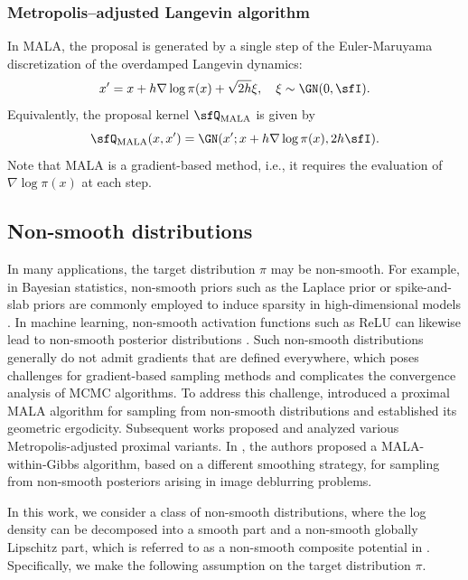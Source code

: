 \documentclass[11pt]{article}
\begin{document}
\subsubsection{Metropolis--adjusted Langevin algorithm}
\label{sec:MALA}
%
In MALA, the proposal is generated by a single step of the Euler-Maruyama discretization of the overdamped Langevin dynamics:
\begin{equation}
    x' = x + h \nabla \log \pi(x) + \sqrt{2h} \xi, \quad \xi \sim \GN(0,\sfI).
\end{equation}
Equivalently, the proposal kernel $\sfQ_{\rm MALA}$ is given by
\begin{equation}
\label{eqn:Q_MALA}
    \sfQ_{\rm MALA}(x,x') = \GN(x'; x + h \nabla \log \pi(x), 2h \sfI).
\end{equation}
%
Note that MALA is a gradient-based method, i.e., it requires the evaluation of $\nabla \log \pi(x)$ at each step.




\subsection{Non-smooth distributions}
\label{sec:NonSmthDist}

In many applications, the target distribution $\pi$ may be non-smooth.
%
For example, in Bayesian statistics, non-smooth priors such as the Laplace prior or spike-and-slab priors are commonly employed to induce sparsity in high-dimensional models \citep{Mitchell01121988,Park01062008}.
In machine learning, non-smooth activation functions such as ReLU can likewise lead to non-smooth posterior distributions \citep{pmlr-v97-vladimirova19a}.
%
Such non-smooth distributions generally do not admit gradients that are defined everywhere, which poses challenges for gradient-based sampling methods and complicates the convergence analysis of MCMC algorithms.
To address this challenge, \cite{MR3515019} introduced a proximal MALA algorithm for sampling from non-smooth distributions and established its geometric ergodicity.
Subsequent works \citep{JMLR:v23:20-527,liang2022proximal,liang2023a} proposed and analyzed various Metropolis-adjusted proximal variants.
In \cite{24M1694781}, the authors proposed a MALA-within-Gibbs algorithm, based on a different smoothing strategy, for sampling from non-smooth posteriors arising in image deblurring problems.


In this work, we consider a class of non-smooth distributions, where the log density can be decomposed into a smooth part and a non-smooth globally Lipschitz part, which is referred to as a non-smooth composite potential in \cite{JMLR:v23:20-527}.
%
Specifically, we make the following assumption on the target distribution $\pi$. 
\end{document}
